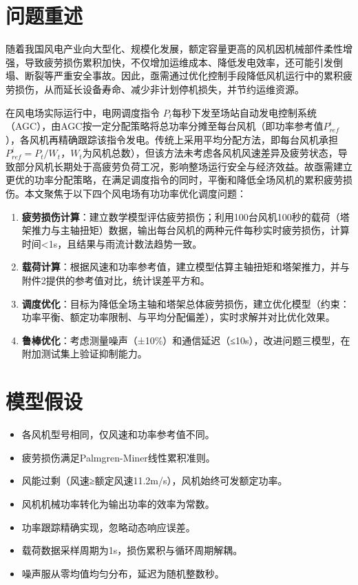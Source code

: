 \documentclass[bwprint]{gmcmthesis}
\numberwithin{figure}{section}
\begin{document}
\section{问题重述}
随着我国风电产业向大型化、规模化发展，额定容量更高的风机因机械部件柔性增强，导致疲劳损伤累积加快，不仅增加运维成本、降低发电效率，还可能引发倒塌、断裂等严重安全事故。因此，亟需通过优化控制手段降低风机运行中的累积疲劳损伤，从而延长设备寿命、减少非计划停机损失，并节约运维资源。
\par 在风电场实际运行中，电网调度指令 $P_t$每秒下发至场站自动发电控制系统（AGC），由AGC按一定分配策略将总功率分摊至每台风机（即功率参考值$P_{ref}^{i}$），各风机再精确跟踪该指令发电。传统上采用平均分配方法，即每台风机承担 $P_{ref}^{i}=P_t/W_t$，$W_t$为风机总数），但该方法未考虑各风机风速差异及疲劳状态，导致部分风机长期处于高疲劳负荷工况，影响整场运行安全与经济效益。故亟需建立更优的功率分配策略，在满足调度指令的同时，平衡和降低全场风机的累积疲劳损伤。本文聚焦于以下四个风电场有功功率优化调度问题：
\begin{enumerate}
	\item \textbf{疲劳损伤计算}：建立数学模型评估疲劳损伤；利用100台风机100秒的载荷（塔架推力与主轴扭矩）数据，输出每台风机的两种元件每秒实时疲劳损伤，计算时间<1s，且结果与雨流计数法趋势一致。
	
	\item \textbf{载荷计算}：根据风速和功率参考值，建立模型估算主轴扭矩和塔架推力，并与附件2提供的参考值对比，统计误差平方和。
	
	\item \textbf{调度优化}：目标为降低全场主轴和塔架总体疲劳损伤，建立优化模型（约束：功率平衡、额定功率限制、与平均分配偏差），实时求解并对比优化效果。
	
	\item \textbf{鲁棒优化}：考虑测量噪声（±10\%）和通信延迟（≤10s），改进问题三模型，在附加测试集上验证抑制能力。
\end{enumerate}

\section{模型假设}
\begin{itemize}
	\item 各风机型号相同，仅风速和功率参考值不同。
	\item 疲劳损伤满足Palmgren-Miner线性累积准则。
	\item 风能过剩（风速≥额定风速11.2m/s），风机始终可发额定功率。
	\item 风机机械功率转化为输出功率的效率为常数。
	\item 功率跟踪精确实现，忽略动态响应误差。
	\item 载荷数据采样周期为1s，损伤累积与循环周期解耦。
	\item 噪声服从零均值均匀分布，延迟为随机整数秒。
\end{itemize}
\newpage
\end{document}

